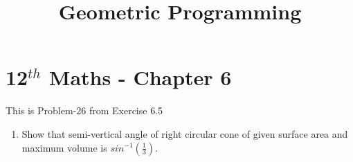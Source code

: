 \documentclass[12pt]{article}
\providecommand{\brak}[1]{\ensuremath{\left(#1\right)}}
\begin{document}
\begin{center}
\title{\textbf{Geometric Programming}}
\date{\vspace{-5ex}} %
\maketitle
\end{center}
\setcounter{page}{1}

\section{12$^{th}$ Maths - Chapter 6}
This is Problem-26 from Exercise 6.5 
\begin{enumerate}
\item Show that semi-vertical angle of right circular cone of given surface area and maximum volume is $sin^{-1}\brak{\frac{1}{3}}$.


\end{enumerate}
\end{document}
